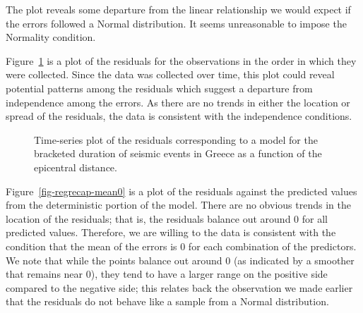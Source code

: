 \documentclass[
  letterpaper,
  DIV=11,
  numbers=noendperiod]{scrreprt}
\theoremstyle{definition}
\theoremstyle{definition}
\theoremstyle{plain}
\theoremstyle{remark}
\begin{document}
The plot reveals some departure from the linear relationship we would
expect if the errors followed a Normal distribution. It seems
unreasonable to impose the Normality condition.

Figure~\ref{fig-regrecap-indep} is a plot of the residuals for the
observations in the order in which they were collected. Since the data
was collected over time, this plot could reveal potential patterns among
the residuals which suggest a departure from independence among the
errors. As there are no trends in either the location or spread of the
residuals, the data is consistent with the independence conditions.

\begin{figure}


\caption{\label{fig-regrecap-indep}Time-series plot of the residuals
corresponding to a model for the bracketed duration of seismic events in
Greece as a function of the epicentral distance.}

\end{figure}%

Figure~\ref{fig-regrecap-mean0} is a plot of the residuals against the
predicted values from the deterministic portion of the model. There are
no obvious trends in the location of the residuals; that is, the
residuals balance out around 0 for all predicted values. Therefore, we
are willing to the data is consistent with the condition that the mean
of the errors is 0 for each combination of the predictors. We note that
while the points balance out around 0 (as indicated by a smoother that
remains near 0), they tend to have a larger range on the positive side
compared to the negative side; this relates back the observation we made
earlier that the residuals do not behave like a sample from a Normal
distribution.
\end{document}
